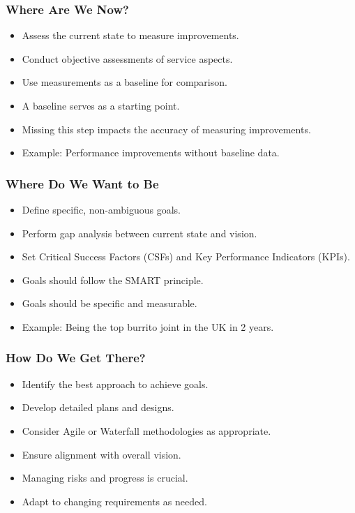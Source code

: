 \documentclass[aspectratio=169, table]{beamer}
\begin{document}
	\begin{frame}
		\frametitle{Where Are We Now?}
		\begin{itemize}
			\item Assess the current state to measure improvements.
			\item Conduct objective assessments of service aspects.
			\item Use measurements as a baseline for comparison.
			\item A baseline serves as a starting point.
			\item Missing this step impacts the accuracy of measuring improvements.
			\item Example: Performance improvements without baseline data.
		\end{itemize}
	\end{frame}
	
	\begin{frame}
		\frametitle{Where Do We Want to Be}
		\begin{itemize}
			\item Define specific, non-ambiguous goals.
			\item Perform gap analysis between current state and vision.
			\item Set Critical Success Factors (CSFs) and Key Performance Indicators (KPIs).
			\item Goals should follow the SMART principle.
			\item Goals should be specific and measurable.
			\item Example: Being the top burrito joint in the UK in 2 years.
		\end{itemize}
	\end{frame}
	
	\begin{frame}
		\frametitle{How Do We Get There?}
		\begin{itemize}
			\item Identify the best approach to achieve goals.
			\item Develop detailed plans and designs.
			\item Consider Agile or Waterfall methodologies as appropriate.
			\item Ensure alignment with overall vision.
			\item Managing risks and progress is crucial.
			\item Adapt to changing requirements as needed.
		\end{itemize}
	\end{frame}
	
\end{document}

